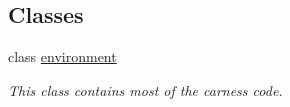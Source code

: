 \subsection*{Classes}
\begin{DoxyCompactItemize}
\item 
class \hyperlink{a00011}{environment}
\begin{DoxyCompactList}\small\item\em This class contains most of the carness code. \end{DoxyCompactList}\end{DoxyCompactItemize}
